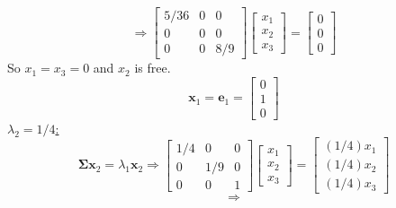 \begin{enumerate}[label=(\alph*)]
            \[
                \Rightarrow
                \begin{bmatrix}
                    5/36 & 0 & 0\\
                    0 & 0 & 0\\
                    0 & 0 & 8/9
                \end{bmatrix}
                \begin{bmatrix}
                    x_1 \\
                    x_2 \\
                    x_3
                \end{bmatrix}
                =
                \begin{bmatrix}
                    0 \\
                    0 \\
                    0
                \end{bmatrix}
            \]
            So $x_1 = x_3 = 0$ and $x_2$ is free.
            \[
                \mathbf{x}_1
                =
                \mathbf{e}_1
                =
                \begin{bmatrix}
                    0 \\
                    1 \\
                    0
                \end{bmatrix}
            \]
            \underline{$\lambda_2 = 1/4$:}
            \[
                \mathbf{\Sigma}\mathbf{x}_2 = \lambda_1\mathbf{x}_2
                \Rightarrow
                \begin{bmatrix}
                    1/4 & 0 & 0\\
                    0 & 1/9 & 0\\
                    0 & 0 & 1
                \end{bmatrix}
                \begin{bmatrix}
                    x_1 \\
                    x_2 \\
                    x_3
                \end{bmatrix}
                =
                \begin{bmatrix}
                    (1/4)x_1 \\
                    (1/4)x_2 \\
                    (1/4)x_3
                \end{bmatrix}
            \]
            \[
                \Rightarrow
\]
\end{enumerate}
